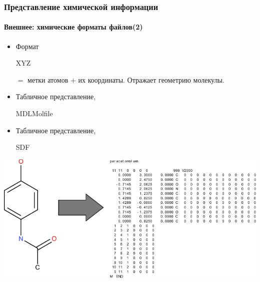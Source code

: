 \begin{frame}
\begin{columns}
\begin{column}{0.5\textwidth}
\end{column}

\end{columns}
\end{frame}

\begin{frame}
  \frametitle{Представление химической информации}
  \framesubtitle{Внешнее: химические форматы файлов(2)}
  \begin{itemize}
    \item Формат \begin{tt}XYZ\end{tt} $=$ метки атомов $+$ их координаты. Отражает геометрию молекулы.
    \item Табличное представление, \begin{tt}MDL\footnotemark Molfile\end{tt} 
    \item Табличное представление, \begin{tt}SDF\end{tt}\footnotemark {}
  \end{itemize}
  \begin{center}
   \includegraphics[scale=0.70]{images/parac.pdf}
  \end{center}
\end{frame}

